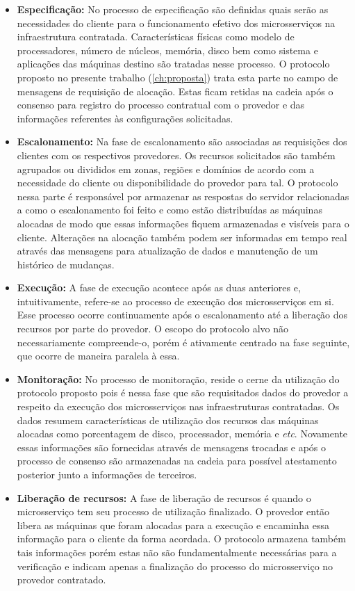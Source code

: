  
 \begin{itemize}
     \item \textbf{Especificação:}
        No processo de especificação são definidas quais serão as necessidades do cliente para o funcionamento efetivo dos microsserviços na infraestrutura contratada. Características físicas como modelo de processadores, número de núcleos, memória, disco bem como sistema e aplicações das máquinas destino são tratadas nesse processo. O protocolo proposto no presente trabalho (\ref{ch:proposta}) trata esta parte no campo de mensagens de requisição de alocação. Estas ficam retidas na cadeia após o consenso para registro do processo contratual com o provedor e das informações referentes às configurações solicitadas.
     \item \textbf{Escalonamento:}
        Na fase de escalonamento são associadas as requisições dos clientes com os respectivos provedores. Os recursos solicitados são também agrupados ou divididos em zonas, regiões e domínios de acordo com a necessidade do cliente ou disponibilidade do provedor para tal. O protocolo nessa parte é responsável por armazenar as respostas do servidor relacionadas a como o escalonamento foi feito e como estão distribuídas as máquinas alocadas de modo que essas informações fiquem armazenadas e visíveis para o cliente. Alterações na alocação também podem ser informadas em tempo real através das mensagens para atualização de dados e manutenção de um histórico de mudanças.
     \item \textbf{Execução:}
        A fase de execução acontece após as duas anteriores e, intuitivamente, refere-se ao processo de execução dos microsserviços em si. Esse processo ocorre continuamente após o escalonamento até a liberação dos recursos por parte do provedor. O escopo do protocolo alvo não necessariamente compreende-o, porém é ativamente centrado na fase seguinte, que ocorre de maneira paralela à essa.
     \item \textbf{Monitoração:}
        No processo de monitoração, reside o cerne da utilização do protocolo proposto pois é nessa fase que são requisitados dados do provedor a respeito da execução dos microsserviços nas infraestruturas contratadas. Os dados resumem características de utilização dos recursos das máquinas alocadas como porcentagem de disco, processador, memória e \textit{etc}. Novamente essas informações são fornecidas através de mensagens trocadas e após o processo de consenso são armazenadas na cadeia para possível atestamento posterior junto a informações de terceiros.
     \item \textbf{Liberação de recursos:} A fase de liberação de recursos é quando o microsserviço tem seu processo de utilização finalizado. O provedor então libera as máquinas que foram alocadas para a execução e encaminha essa informação para o cliente da forma acordada. O protocolo armazena também tais informações porém estas não são fundamentalmente necessárias para a verificação e indicam apenas a finalização do processo do microsserviço no provedor contratado.
 \end{itemize}
 
